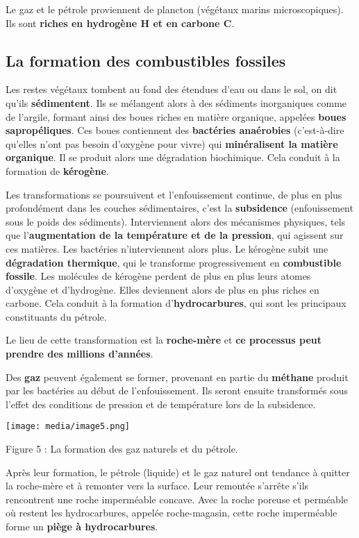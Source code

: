 \begin{itemize}
Le gaz et le pétrole proviennent de plancton (végétaux marins
microscopiques). Ils sont \textbf{riches en hydrogène H et en carbone
C}.

\subsection{La formation des combustibles
fossiles}\label{la-formation-des-combustibles-fossiles}

Les restes végétaux tombent au fond des étendues d'eau ou dans le sol,
on dit qu'ils \textbf{sédimentent}. Ils se mélangent alors à des
sédiments inorganiques comme de l'argile, formant ainsi des boues riches
en matière organique, appelées \textbf{boues sapropéliques}. Ces boues
contiennent des \textbf{bactéries anaérobies} (c'est-à-dire qu'elles
n'ont pas besoin d'oxygène pour vivre) qui \textbf{minéralisent la
matière organique}. Il se produit alors une dégradation biochimique.
Cela conduit à la formation de \textbf{kérogène}.

Les transformations se poursuivent et l'enfouissement continue, de plus
en plus profondément dans les couches sédimentaires, c'est la
\textbf{subsidence} (enfouissement sous le poids des sédiments).
Interviennent alors des mécanismes physiques, tels que
l'\textbf{augmentation de la température et de la pression}, qui
agissent sur ces matières. Les bactéries n'interviennent alors plus. Le
kérogène subit une \textbf{dégradation thermique}, qui le transforme
progressivement en \textbf{combustible fossile}. Les molécules de
kérogène perdent de plus en plus leurs atomes d'oxygène et d'hydrogène.
Elles deviennent alors de plus en plus riches en carbone. Cela conduit à
la formation d'\textbf{hydrocarbures}, qui sont les principaux
constituants du pétrole.

Le lieu de cette transformation est la \textbf{roche-mère} et \textbf{ce
processus peut prendre des millions d'années}.

Des \textbf{gaz} peuvent également se former, provenant en partie du
\textbf{méthane} produit par les bactéries au début de l'enfouissement.
Ils seront ensuite transformés sous l'effet des conditions de pression
et de température lors de la subsidence.

\texttt{[image: media/image5.png]}

\protect\hypertarget{la-formation-des-gaz-naturels-et-du-puxe9tr}{}{}Figure
5 : La formation des gaz naturels et du pétrole.

Après leur formation, le pétrole (liquide) et le gaz naturel ont
tendance à quitter la roche-mère et à remonter vers la surface. Leur
remontée s'arrête s'ils rencontrent une roche imperméable concave. Avec
la roche poreuse et perméable où restent les hydrocarbures, appelée
roche-magasin, cette roche imperméable forme un \textbf{piège à
hydrocarbures}.


\end{itemize}
